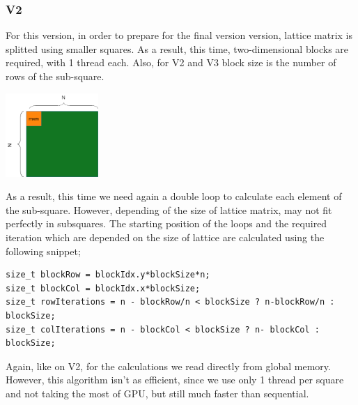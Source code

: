 \documentclass[11pt]{article}
\begin{document}
\subsubsection{V2}
\label{sec:org1d610d3}
For this version, in order to prepare for the final version version, lattice matrix is splitted using smaller squares. As a result, this time, two-dimensional blocks are required, with 1 thread each. Also, for V2 and V3 block size is the number of rows of the sub-square.
\begin{center}
\includegraphics[height=120]{./images/cuda-square-split.png}
\end{center}
As a result, this time we need again a double loop to calculate each element of the sub-square. However, depending of the size of lattice matrix, may not fit perfectly in subsquares. The starting position of the loops and the required iteration which are depended on the size of lattice are calculated using the following snippet;
\begin{verbatim}
size_t blockRow = blockIdx.y*blockSize*n;
size_t blockCol = blockIdx.x*blockSize;
size_t rowIterations = n - blockRow/n < blockSize ? n-blockRow/n : blockSize;
size_t colIterations = n - blockCol < blockSize ? n- blockCol : blockSize;
\end{verbatim}
Again, like on V2, for the calculations we read directly from global memory. However, this algorithm isn't as efficient, since we use only 1 thread per square and not taking the most of GPU, but still much faster than sequential.
\end{document}
